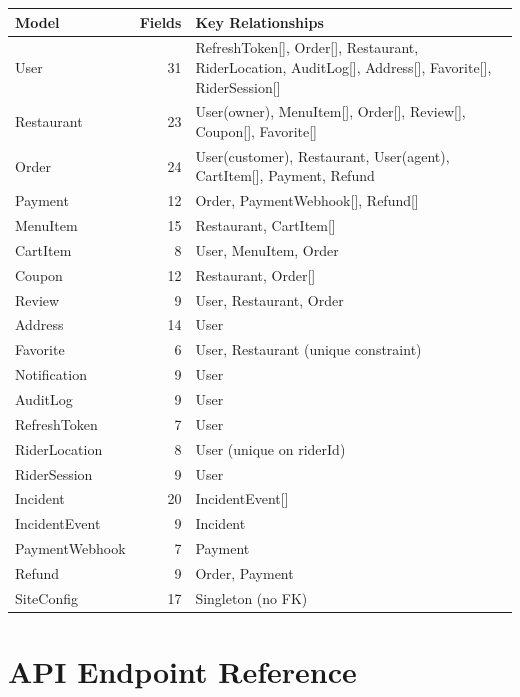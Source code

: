 \documentclass[11pt,a4paper,twoside]{book}
\newcommand{\th}[1]{\textbf{\color{white}#1}}
\begin{document}
\begin{center}\small
\begin{longtable}{p{3.5cm}rp{8cm}}
\toprule
\rowcolor{headbg}\th{Model} & \th{Fields} & \th{Key Relationships} \\
\midrule
User          & 31 & RefreshToken[], Order[], Restaurant, RiderLocation, AuditLog[], Address[], Favorite[], RiderSession[] \\
\rowcolor{rowalt}Restaurant    & 23 & User(owner), MenuItem[], Order[], Review[], Coupon[], Favorite[] \\
Order         & 24 & User(customer), Restaurant, User(agent), CartItem[], Payment, Refund \\
\rowcolor{rowalt}Payment       & 12 & Order, PaymentWebhook[], Refund[] \\
MenuItem      & 15 & Restaurant, CartItem[] \\
\rowcolor{rowalt}CartItem      & 8  & User, MenuItem, Order \\
Coupon        & 12 & Restaurant, Order[] \\
\rowcolor{rowalt}Review        & 9  & User, Restaurant, Order \\
Address       & 14 & User \\
\rowcolor{rowalt}Favorite      & 6  & User, Restaurant (unique constraint) \\
Notification  & 9  & User \\
\rowcolor{rowalt}AuditLog      & 9  & User \\
RefreshToken  & 7  & User \\
\rowcolor{rowalt}RiderLocation & 8  & User (unique on riderId) \\
RiderSession  & 9  & User \\
\rowcolor{rowalt}Incident      & 20 & IncidentEvent[] \\
IncidentEvent & 9  & Incident \\
\rowcolor{rowalt}PaymentWebhook & 7  & Payment \\
Refund        & 9  & Order, Payment \\
\rowcolor{rowalt}SiteConfig    & 17 & Singleton (no FK) \\
\bottomrule
\end{longtable}
\end{center}

\chapter{API Endpoint Reference}
\end{document}
